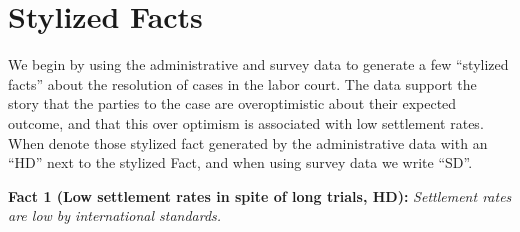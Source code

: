 \documentclass[11pt]{article}
\begin{document}
\section{Stylized Facts}\label{FactsSection}

We begin by using the administrative and survey data to generate a few “stylized facts” about the resolution of cases in the labor court. The data support the story that the parties to the case are overoptimistic about their expected outcome, and that this over optimism is associated with low settlement rates. When denote those stylized fact generated by the administrative data with an ``HD'' next to the stylized Fact, and when using survey data we write ``SD''.

\vspace{.3in}
\begin{singlespace}
\textbf{Fact 1 (Low settlement rates in spite of long trials, HD):} \emph{Settlement rates are low by international standards.}
\end{singlespace}
\vspace{.1in}

\end{document}
